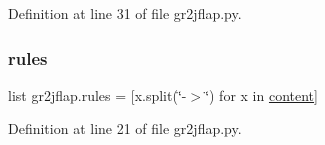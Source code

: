 Definition at line 31 of file gr2jflap.\+py.

\mbox{\label{namespacegr2jflap_a1f275e6ae4855de88fee6d6f262d6476}} 
\subsubsection{\texorpdfstring{rules}{rules}}
{\footnotesize\ttfamily list gr2jflap.\+rules = \mbox{[}x.\+split(\char`\"{}-\/$>$\char`\"{}) for x in \hyperlink{namespacegr2jflap_a1b05b532957a71dfe47067d02b219a20}{content}\mbox{]}}



Definition at line 21 of file gr2jflap.\+py.

